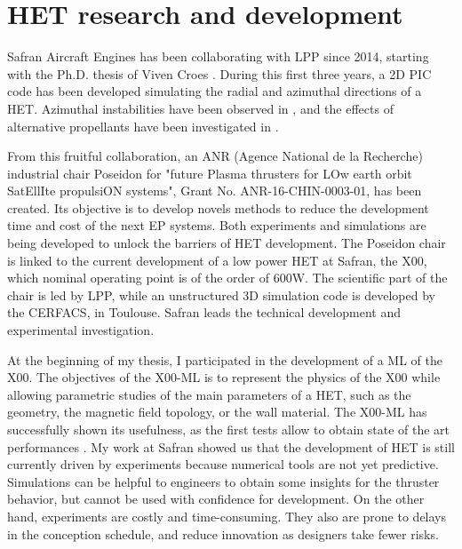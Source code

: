 

\section*{\ac{HET} research and development}
\label{sec-poseidon}

Safran Aircraft Engines has been collaborating with \ac{LPP} since 2014, starting with the Ph.D. thesis of Viven Croes \citep{croes2017}.
During this first three years, a \ac{2D} \ac{PIC} code has been developed simulating the radial and azimuthal directions of a \ac{HET}.
Azimuthal instabilities have been observed in \citet{croes2017a}, and the effects of alternative propellants have been investigated in \citet{croes2018}.

From this fruitful collaboration, an ANR (Agence National de la Recherche) industrial chair {\sc Poseidon} for  "future Plasma thrusters for LOw earth orbit SatEllIte propulsiON systems", Grant No. ANR-16-CHIN-0003-01, has been created.
Its objective is to develop novels methods to reduce the development time and cost of the next \ac{EP} systems.
Both experiments and simulations are being developed to unlock the barriers of \ac{HET} development.
The {\sc Poseidon} chair is linked to the current development of a  low power \ac{HET} at Safran, the \PPS X00, which nominal operating point is of the order of 600W.
The scientific part of the chair is led by \ac{LPP}, while an unstructured \ac{3D} simulation code is developed by the CERFACS, in Toulouse.
Safran leads the technical development and experimental investigation.

At the beginning of my thesis, I participated in the development of a \ac{ML} of the \PPS X00.
The objectives of the \PPS X00-\ac{ML}  is to represent the physics of the \PPS X00 while allowing parametric studies of the main parameters of a \ac{HET}, such as the geometry, the magnetic field topology, or the wall material.
The \PPS X00-\ac{ML} has successfully shown its usefulness, as the first tests allow to obtain state of the art performances \citep{vaudolon2018}.
My work at Safran showed us that the development of \ac{HET} is still currently driven by experiments because numerical tools are not yet predictive.
Simulations can be helpful to engineers to obtain some insights for the thruster behavior, but cannot be used with confidence for development.
On the other hand, experiments are costly and time-consuming.
They also are prone to delays in the conception schedule, and reduce innovation as designers take fewer risks.

